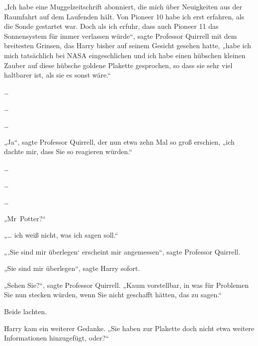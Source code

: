 „Ich habe eine Muggelzeitschrift abonniert, die mich über Neuigkeiten aus der Raumfahrt auf dem Laufenden hält. Von Pioneer 10 habe ich erst erfahren, als die Sonde gestartet war. Doch als ich erfuhr, dass auch Pioneer 11 das Sonnensystem für immer verlassen würde“, sagte Professor Quirrell mit dem breitesten Grinsen, das Harry bisher auf seinem Gesicht gesehen hatte, „habe ich mich tatsächlich bei NASA eingeschlichen und ich habe einen hübschen kleinen Zauber auf diese hübsche goldene Plakette gesprochen, so dass sie sehr viel haltbarer ist, als sie es sonst wäre.“

…

…

…

„Ja“, sagte Professor Quirrell, der nun etwa zehn Mal so groß erschien, „ich dachte mir, dass Sie so reagieren würden.“

…

…

…

„Mr~Potter?“

„… ich weiß nicht, was ich sagen soll.“

„‚Sie sind mir überlegen‘ erscheint mir angemessen“, sagte Professor Quirrell.

„Sie sind mir überlegen“, sagte Harry sofort.

„Sehen Sie?“, sagte Professor Quirrell. „Kaum vorstellbar, in was für Problemen Sie nun stecken würden, wenn Sie nicht geschafft hätten, das zu sagen.“

Beide lachten.

Harry kam ein weiterer Gedanke. „Sie haben zur Plakette doch nicht etwa weitere Informationen hinzugefügt, oder?“

